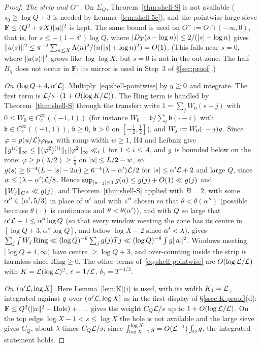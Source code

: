 \begin{proof}
\emph{The strip and $O^-$.} On $\Sigma_Q$, Theorem~\ref{thm:shell-S} is not available ($s_0\ge\log Q+3$ is needed by Lemma~\ref{lem:shell-5c}), and the pointwise
large sieve $\mathbf F\le(Q^2+\pi X)\lVert a\rVert^2$ is kept. The same bound is used on $O^-:=O\cap(-\infty,0)$, that is, for $s\le-(1-\delta')\log Q$, where
$\lvert D_T(s-\log n)\rvert\le2/(\lvert s\rvert+\log n)$ gives $\lVert a(s)\rVert^2\le\pi^{-2}\sum_{n\le X}\Lambda(n)^2/(n(\lvert s\rvert+\log n)^2)=O(1)$. (This fails near $s=0$, where
$\lVert a(s)\rVert^2$ grows like $\log\log X$, but $s=0$ is not in the out-zone. The half $B_\chi$ does not occur in $\mathbf F$; its mirror is used in Step~3 of
\S\ref{sec:proof}.)

\emph{On $(\log Q+4,\alpha'\mathcal L]$.} Multiply~\eqref{eq:shell-pointwise} by $g\ge0$ and integrate. The first term is $\mathcal L/s\cdot(1+O(\log K/\mathcal L))$. The Ring term is
handled by Theorem~\ref{thm:shell-S} through the transfer: write $1=\sum_jW_0(s-j)$ with $0\le W_0\in C_c^\infty((-1,1))$ (for instance $W_0=\mathfrak b/\sum_i\mathfrak b(\cdot-i)$ with $\mathfrak b\in C_c^\infty((-1,1))$, $\mathfrak b\ge0$, $\mathfrak b>0$ on $[-\frac12,\frac12]$), and $W_j:=W_0(\cdot-j)g$. Since $\varphi=p(u/\mathcal L)\varphi_{\rm flat}$
with ramp width $w\ge1$, H4 and Leibniz give $\lVert g^{(i)}\rVert_\infty\le\lVert (\varphi^2)^{(i)}\rVert_1\lVert \varphi^2\rVert_\infty\ll_i1$ for $1\le i\le A$, and $g$ is bounded
below on the zone: $\varphi\ge p(\lambda/2)\ge\frac16$ on $\lvert u\rvert\le L/2-w$, so $g(s)\ge6^{-4}(L-\lvert s\rvert-2w)\ge6^{-4}(\lambda-\alpha')\mathcal L/2$ for
$\lvert s\rvert\le\alpha'\mathcal L+2$ and large $Q$, since $w\le(\lambda-\alpha')\mathcal L/8$. Hence $\sup_{\lvert u-j\rvert\le1}g(u)\le g(j)+O(1)\ll g(j)$ and $\lVert W_j\rVert_{C^A}\ll g(j)$, and Theorem~\ref{thm:shell-S} applied with $B=2$, with some
$\alpha''\in(\alpha',5/3)$ in place of $\alpha'$ and with $\varepsilon''$ chosen so that $\theta<\theta(\alpha'')$ (possible because $\theta(\cdot)$ is continuous and
$\theta<\theta(\alpha')$), and with $Q$ so large that $\alpha'\mathcal L+1\le\alpha''\log Q$ (so that every window meeting the zone has its centre in
$[\log Q+3,\alpha''\log Q]$, and below $\log X-2$ since $\alpha'<\lambda$), gives $\sum_j\int W_j\,\mathrm{Ring}\ll(\log Q)^{-\theta}\sum_jg(j)Tj\ll(\log Q)^{-\theta}\int g\lVert a\rVert^2$. Windows meeting $[\log Q+4,\infty)$
have centre $\ge\log Q+3$, and over-counting inside the strip is harmless since $\mathrm{Ring}\ge0$. The other terms of~\eqref{eq:shell-pointwise} are
$O(\log\mathcal L/\mathcal L)$ with $K=\mathcal L(\log\mathcal L)^2$, $\epsilon=1/\mathcal L$, $\delta_1=T^{-1/3}$.

\emph{On $(\alpha'\mathcal L,\log X]$.} Here Lemma~\ref{lem:K}(i) is used, with its width $K_1=\mathcal L$, integrated against $g$ over $(\alpha'\mathcal L,\log X]$ as in the first display of \S\ref{ssec:K-proof}(d): $\mathbf F\le Q^2(\lVert a\rVert^2-\mathrm{Hole})+\dots$ gives the weight
$C_Q\mathcal L/s$ up to $1+O(\log\mathcal L/\mathcal L)$. On the top edge $\log X-1<s\le\log X$ the hole is not available and the large sieve gives $C_Q$, about $\lambda$ times
$C_Q\mathcal L/s$; since $\int_{\log X-1}^{\log X}g=O(\mathcal L^{-1})\int_Og$, the integrated statement holds.
\end{proof}

